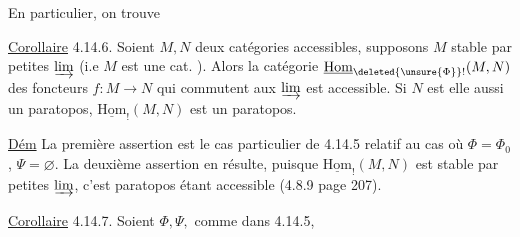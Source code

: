 En particulier, on trouve

\uline{Corollaire} 4.14.6. Soient $M,N$ deux catégories accessibles, supposons $M$ stable par petites $\varinjlim$ (i.e $M$ est une cat. ). Alors la catégorie $\underline{\mathrm{Hom}}_{\deleted{\unsure{\Phi}}!}(M,N)$ des foncteurs $f:M\longrightarrow N$ qui commutent aux  $\varinjlim$ est accessible. Si $N$ est elle aussi un paratopos, $\underline{\mathrm{Hom}}_!(M,N)$ est un paratopos.

\uline{Dém} La première assertion est le cas particulier de 4.14.5 relatif au cas où $\Phi=\Phi_0$, $\Psi=\varnothing$. La deuxième assertion en résulte, puisque $\underline{\mathrm{Hom}}_!(M,N)$ est  stable par petites $\varinjlim$,  c'est  paratopos étant accessible (4.8.9 page 207).

\uline{Corollaire} 4.14.7. Soient $\Phi,\Psi,$ comme dans 4.14.5,  
